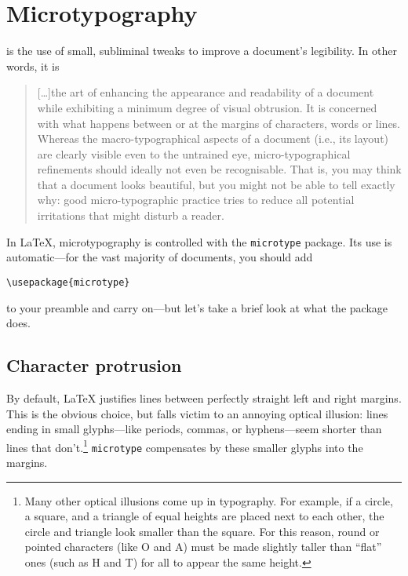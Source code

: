 \chapter{Microtypography}
\label{microtype}

 is the use of small, subliminal tweaks to improve
a document's legibility.
In other words, it is
\begin{quote}
[\dots]the art of enhancing the appearance and readability of a
document while exhibiting a minimum degree of visual obtrusion.
It is concerned with what happens between or at the margins of characters,
words or lines. Whereas the macro-typographical aspects of a document
(i.e., its layout) are clearly visible even to the untrained eye,
micro-typographical refinements should ideally not even be recognisable.
That is, you may think that a document looks beautiful, but you
might not be able to tell exactly why: good micro-typographic practice tries to
reduce all potential irritations that might disturb a reader.\punckern{}
\end{quote}

In \LaTeX{}, microtypography is controlled with the
\texttt{microtype} package.
Its use is automatic---for the vast majority of documents, you should add
\begin{leftfigure}
\begin{lstlisting}
\usepackage{microtype}
\end{lstlisting}
\end{leftfigure}
to your preamble and carry on---but let's take a brief look at what the package
does.

\section{Character protrusion}

By default, \LaTeX{} justifies lines between perfectly straight
left and right margins.
This is the obvious choice,
but falls victim to an annoying optical illusion:
lines ending in small glyphs---like periods, commas,
or hyphens---seem shorter than lines that
don't.\punckern\footnote{Many other optical illusions come up in typography.
For example, if a circle, a square, and a triangle
of equal heights are placed next to each other,
the circle and triangle look smaller than the square.
For this reason, round or pointed characters (like O and A) must
be made slightly taller than ``flat'' ones (such as H and T) for all
to appear the same height.\punckern{}}
\texttt{microtype} compensates by  these smaller glyphs
into the margins.

